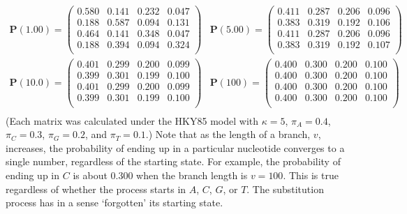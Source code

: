 \documentclass{svmult}
\begin{document}
$$
\begin{array}{cc}
{{\mathbf P}(1.00) = \left( \begin{array}{rrrr}
0.580 & 0.141 & 0.232 & 0.047 \\
0.188 & 0.587 & 0.094 & 0.131 \\
0.464 & 0.141 & 0.348 & 0.047 \\
0.188 & 0.394 & 0.094 & 0.324 \\
\end{array} \right)}
 &
{{\mathbf P}(5.00) = \left( \begin{array}{rrrr}
0.411 & 0.287 & 0.206 & 0.096 \\
0.383 & 0.319 & 0.192 & 0.106 \\
0.411 & 0.287 & 0.206 & 0.096 \\
0.383 & 0.319 & 0.192 & 0.107 \\
\end{array} \right)}
\end{array}
$$
$$
\begin{array}{cc}
{{\mathbf P}(10.0) = \left( \begin{array}{rrrr}
0.401 & 0.299 & 0.200 & 0.099 \\
0.399 & 0.301 & 0.199 & 0.100 \\
0.401 & 0.299 & 0.200 & 0.099 \\
0.399 & 0.301 & 0.199 & 0.100 \\
\end{array} \right)}
 &
{{\mathbf P}(100) = \left( \begin{array}{rrrr}
0.400 & 0.300 & 0.200 & 0.100 \\
0.400 & 0.300 & 0.200 & 0.100 \\
0.400 & 0.300 & 0.200 & 0.100 \\
0.400 & 0.300 & 0.200 & 0.100 \\
\end{array} \right)}
\\
\end{array}
$$
(Each matrix was calculated under the HKY85 model with $\kappa = 5$, $\pi_A = 0.4$, $\pi_C = 0.3$,
$\pi_G = 0.2$, and $\pi_T = 0.1$.) Note that as the length of a branch, $v$, increases, the
probability of ending up in a particular nucleotide converges to a single number, regardless of the
starting state. For example, the probability of ending up in $C$ is about 0.300 when the branch
length is $v=100$. This is true regardless of whether the process starts in $A$, $C$, $G$, or $T$.
The substitution process has in a sense `forgotten' its starting state.
\end{document}
